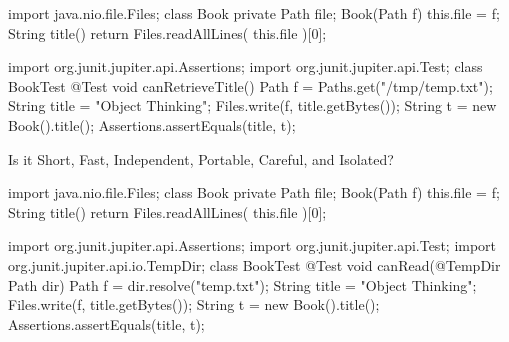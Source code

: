 \documentclass{article}
\begin{document}
\clearpage\begin{pptWide}{2}\small
\begin{ffcode}
import java.nio.file.Files;
class Book {
  private Path file;
  Book(Path f) {
    this.file = f;
  }
  String title() {
    return Files.readAllLines(
      this.file
    )[0];
  }
}
\end{ffcode}
\par\columnbreak
\begin{ffcode}
import org.junit.jupiter.api.Assertions;
import org.junit.jupiter.api.Test;
class BookTest {
  @Test
  void canRetrieveTitle() {
    Path f = Paths.get("/tmp/temp.txt");
    String title = "Object Thinking";
    Files.write(f, title.getBytes());
    String t = new Book().title();
    Assertions.assertEquals(title, t);
  }
}
\end{ffcode}
\end{pptWide}
Is it Short, Fast, Independent, Portable, Careful, and Isolated?
\clearpage

\clearpage\begin{pptWide}{2}\small
\begin{ffcode}
import java.nio.file.Files;
class Book {
  private Path file;
  Book(Path f) {
    this.file = f;
  }
  String title() {
    return Files.readAllLines(
      this.file
    )[0];
  }
}
\end{ffcode}
\par\columnbreak
\begin{ffcode}
import org.junit.jupiter.api.Assertions;
import org.junit.jupiter.api.Test;
import org.junit.jupiter.api.io.TempDir;
class BookTest {
  @Test
  void canRead(@TempDir Path dir) {
    Path f = dir.resolve("temp.txt");
    String title = "Object Thinking";
    Files.write(f, title.getBytes());
    String t = new Book().title();
    Assertions.assertEquals(title, t);
  }
}
\end{ffcode}
\end{pptWide}\clearpage



\end{document}
